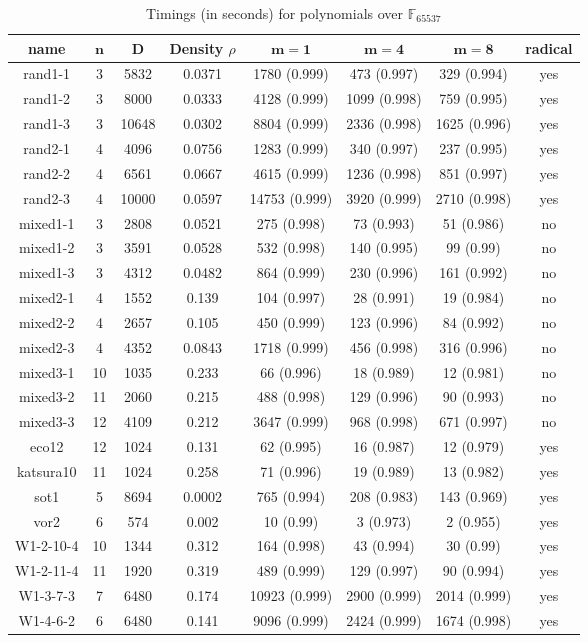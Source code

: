 \documentclass[12pt]{article}
\def\F {\ensuremath{\mathbb{F}}}
\begin{document}
\begin{table}[H]
 \def\arraystretch{1.2}
\setlength\tabcolsep{6pt}
	\caption{Timings (in seconds) for polynomials over $\F_{65537}$}
\begin{center}
	\begin{tabular}{c|c|c|c|c|c|c|c}
		\textbf{name}& $\bm{n}$ & $\bm{D}$ & \textbf{Density $\rho$} & $\bm{m = 1}$ & $\bm{m = 4}$ & $\bm{m = 8}$ & \textbf{radical} \\
		\hline
		rand1-1&3 &5832&0.0371&1780 (0.999)&473 (0.997)&329 (0.994)&yes\\
		rand1-2&3 &8000&0.0333&4128 (0.999)&1099 (0.998)&759 (0.995)&yes\\
		rand1-3&3 &10648&0.0302&8804 (0.999)&2336 (0.998)&1625 (0.996)&yes\\
		rand2-1&4 &4096&0.0756&1283 (0.999)&340 (0.997)&237 (0.995)&yes\\
		rand2-2&4 &6561&0.0667&4615 (0.999)&1236 (0.998)&851 (0.997)&yes\\
		rand2-3&4 &10000&0.0597&14753 (0.999)&3920 (0.999)&2710 (0.998)&yes\\
		mixed1-1&3 &2808&0.0521&275 (0.998)&73 (0.993)&51 (0.986)&no\\
		mixed1-2&3 &3591&0.0528&532 (0.998)&140 (0.995)&99 (0.99)&no\\
		mixed1-3&3 &4312&0.0482&864 (0.999)&230 (0.996)&161 (0.992)&no\\
		mixed2-1&4 &1552&0.139&104 (0.997)&28 (0.991)&19 (0.984)&no\\
		mixed2-2&4 &2657&0.105&450 (0.999)&123 (0.996)&84 (0.992)&no\\
		mixed2-3&4 &4352&0.0843&1718 (0.999)&456 (0.998)&316 (0.996)&no\\
		mixed3-1&10 &1035&0.233&66 (0.996)&18 (0.989)&12 (0.981)&no\\
		mixed3-2&11 &2060&0.215&488 (0.998)&129 (0.996)&90 (0.993)&no\\
		mixed3-3&12 &4109&0.212&3647 (0.999)&968 (0.998)&671 (0.997)&no\\
		eco12&12 &1024&0.131&62 (0.995)&16 (0.987)&12 (0.979)&yes\\
		katsura10&11 &1024&0.258&71 (0.996)&19 (0.989)&13 (0.982)&yes\\
		sot1&5 &8694&0.0002&765 (0.994)&208 (0.983)&143 (0.969)&yes\\
		vor2&6 &574&0.002&10 (0.99)&3 (0.973)&2 (0.955)&yes\\
		W1-2-10-4&10 &1344&0.312&164 (0.998)&43 (0.994)&30 (0.99)&yes\\
		W1-2-11-4&11 &1920&0.319&489 (0.999)&129 (0.997)&90 (0.994)&yes\\
		W1-3-7-3&7 &6480&0.174&10923 (0.999)&2900 (0.999)&2014 (0.999)&yes\\
		W1-4-6-2&6 &6480&0.141&9096 (0.999)&2424 (0.999)&1674 (0.998)&yes
	\end{tabular}
\end{center}
\end{table}
\end{document}
